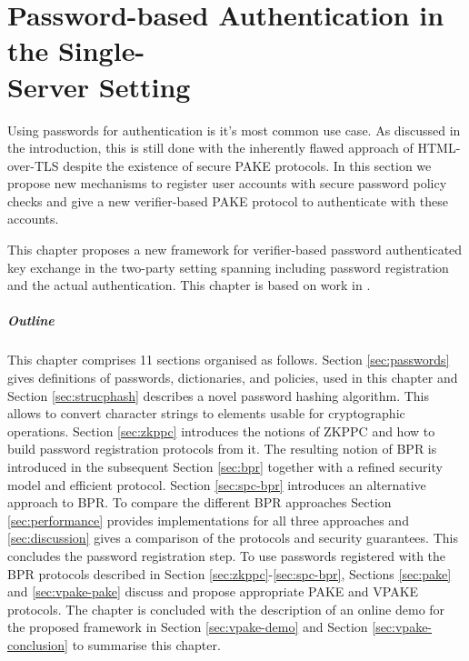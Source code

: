 \chapter[Password-based Authentication in the Single-Server Setting]{Password-based Authentication in the Single-\texorpdfstring{\\}{}Server Setting} \label{ch:vpake}
Using passwords for authentication is it's most common use case.
As discussed in the introduction, this is still done with the inherently flawed approach of \ac{HTML}-over-\ac{TLS} despite the existence of secure \ac{PAKE} protocols.
In this section we propose new mechanisms to register user accounts with secure password policy checks and give a new verifier-based \ac{PAKE} protocol to authenticate with these accounts.

This chapter proposes a new framework for verifier-based password authenticated key exchange in the two-party setting spanning including password registration and the actual authentication.
This chapter is based on work in \cite{Kiefer13a,Kiefer2012,KieferM14b,KieferM15a,DongK15a,ManulisSKD15a}.

\paragraph{Outline}
This chapter comprises 11 sections organised as follows.
Section \ref{sec:passwords} gives definitions of passwords, dictionaries, and policies, used in this chapter and Section \ref{sec:strucphash} describes a novel password hashing algorithm.
This allows to convert character strings to elements usable for cryptographic operations.
Section \ref{sec:zkppc} introduces the notions of \ac{ZKPPC} and how to build password registration protocols from it.
The resulting notion of \ac{BPR} is introduced in the subsequent Section \ref{sec:bpr} together with a refined security model and efficient protocol.
Section \ref{sec:spc-bpr} introduces an alternative approach to \ac{BPR}.
To compare the different \ac{BPR} approaches Section \ref{sec:performance} provides implementations for all three approaches and \ref{sec:discussion} gives a comparison of the protocols and security guarantees.
This concludes the password registration step.
To use passwords registered with the \ac{BPR} protocols described in Section \ref{sec:zkppc}-\ref{sec:spc-bpr}, Sections \ref{sec:pake} and \ref{sec:vpake-pake} discuss and propose appropriate \ac{PAKE} and \ac{VPAKE} protocols.
The chapter is concluded with the description of an online demo for the proposed framework in Section \ref{sec:vpake-demo} and Section \ref{sec:vpake-conclusion} to summarise this chapter.

